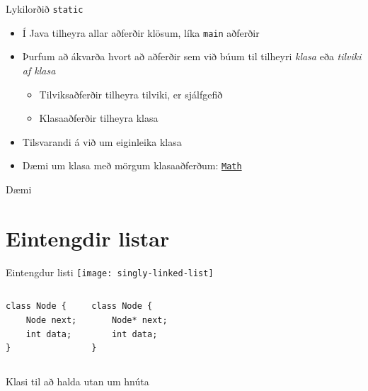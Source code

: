 \documentclass{beamer}
\begin{document}
\begin{frame}{Lykilorðið \texttt{static}}
	\begin{itemize}
		\item Í Java tilheyra allar aðferðir klösum, líka \texttt{main} aðferðir
		\item Þurfum að ákvarða hvort að aðferðir sem við búum til tilheyri \emph{klasa} eða \emph{tilviki af klasa}
		      \begin{itemize}
			      \item Tilviksaðferðir  tilheyra tilviki, er sjálfgefið
			      \item Klasaaðferðir  tilheyra klasa
		      \end{itemize}
		\item Tilsvarandi á við um eiginleika klasa 
		\item Dæmi um klasa með mörgum klasaaðferðum: \href{https://docs.oracle.com/javase/8/docs/api/java/lang/Math.html}{\texttt{Math}}
	\end{itemize}
\end{frame}

\begin{frame}{Dæmi}
\end{frame}

\section{Eintengdir listar}

\begin{frame}[fragile]{Eintengdur listi}
	\texttt{[image: singly-linked-list]}

	\begin{columns}
		\begin{verbatim}
class Node {
    Node next;
    int data;
}
		\end{verbatim}
		\begin{verbatim}
class Node {
    Node* next;
    int data;
}
\end{verbatim}

	\end{columns}
\end{frame}

\begin{frame}[fragile]{Klasi til að halda utan um hnúta}
\end{frame}
\end{document}

